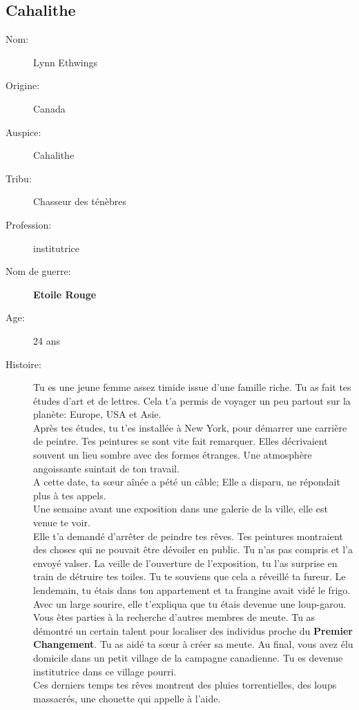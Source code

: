 \documentclass[oneside,12pt]{book}
\newcommand{\Lynn}{\textbf{Etoile Rouge} }
\begin{document}
\begin{flushleft}
\section{Cahalithe}
\begin{description}
\item[Nom:]{Lynn Ethwings}
\item[Origine:]{Canada}
\item[Auspice:]{Cahalithe}
\item[Tribu:]{Chasseur des ténèbres}
\item[Profession:]{institutrice}
\item[Nom de guerre:]{\Lynn}
\item[Age:]{24 ans}
\item[Histoire:]{ 
Tu es une jeune femme assez timide issue d'une famille riche. Tu as fait tes études d'art et de lettres. Cela t'a permis de voyager un peu partout sur la planète: Europe, USA et Asie. \\
Après tes études, tu t'es installée à New York, pour démarrer une carrière de peintre. Tes peintures se sont vite fait remarquer. Elles décrivaient souvent un lieu sombre avec des formes étranges. Une atmosphère angoissante suintait de ton travail. \\ 
A cette date, ta sœur aînée a pété un câble; Elle a disparu, ne répondait plus à tes appels.\\  Une semaine avant une exposition dans une galerie de la ville, elle est venue te voir.\\
Elle t'a demandé d'arrêter de peindre tes rêves. Tes peintures montraient des choses qui ne pouvait être dévoiler en public. Tu n'as pas compris et l'a envoyé valser. 
La veille de l'ouverture de l'exposition, tu l'as surprise en train de détruire tes toiles. Tu te souviens que cela a réveillé ta fureur. 
Le lendemain, tu étais dans ton appartement et ta frangine avait vidé le frigo. \\
Avec un large sourire, elle t'expliqua que tu étais devenue une loup-garou.\\ Vous êtes parties à la recherche d'autres membres de meute. 
Tu as démontré un certain talent pour localiser des individus proche du \textbf{Premier Changement}. Tu as aidé ta sœur à créer sa meute. Au final, vous avez élu domicile dans un petit village de la campagne canadienne. Tu es devenue institutrice dans ce village pourri.\\
Ces derniers temps tes rêves montrent des pluies torrentielles, des loups massacrés, une chouette qui appelle à l'aide.\\
}
\end{description}
\end{flushleft}
\end{document}

